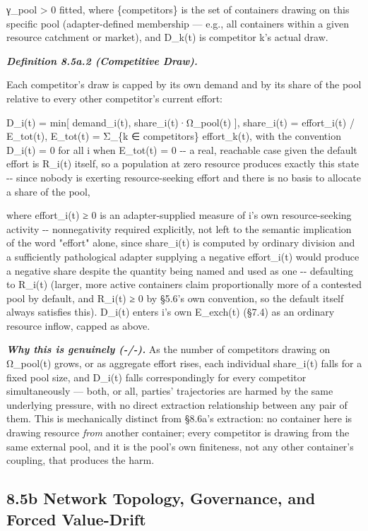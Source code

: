 \documentclass[
]{article}
\begin{document}
γ\_pool \textgreater{} 0 fitted, where \{competitors\} is the set of
containers drawing on this specific pool (adapter-defined membership ---
e.g., all containers within a given resource catchment or market), and
D\_k(t) is competitor k's actual draw.

\emph{\textbf{Definition 8.5a.2 (Competitive Draw).}}

Each competitor's draw is capped by its own demand and by its share of
the pool relative to every other competitor's current effort:

D\_i(t) = min{[} demand\_i(t), share\_i(t)·Ω\_pool(t) {]}, share\_i(t) =
effort\_i(t) / E\_tot(t), E\_tot(t) = Σ\_\{k ∈ competitors\}
effort\_k(t), with the convention D\_i(t) = 0 for all i when E\_tot(t) =
0 -\/- a real, reachable case given the default effort is R\_i(t)
itself, so a population at zero resource produces exactly this state
-\/- since nobody is exerting resource-seeking effort and there is no
basis to allocate a share of the pool,

where effort\_i(t) ≥ 0 is an adapter-supplied measure of i's own
resource-seeking activity -\/- nonnegativity required explicitly, not
left to the semantic implication of the word "effort" alone, since
share\_i(t) is computed by ordinary division and a sufficiently
pathological adapter supplying a negative effort\_i(t) would produce a
negative share despite the quantity being named and used as one -\/-
defaulting to R\_i(t) (larger, more active containers claim
proportionally more of a contested pool by default, and R\_i(t) ≥ 0 by
§5.6's own convention, so the default itself always satisfies this).
D\_i(t) enters i's own E\_exch(t) (§7.4) as an ordinary resource inflow,
capped as above.

\emph{\textbf{Why this is genuinely (-/-).}} As the number of
competitors drawing on Ω\_pool(t) grows, or as aggregate effort rises,
each individual share\_i(t) falls for a fixed pool size, and D\_i(t)
falls correspondingly for every competitor simultaneously --- both, or
all, parties' trajectories are harmed by the same underlying pressure,
with no direct extraction relationship between any pair of them. This is
mechanically distinct from §8.6a's extraction: no container here is
drawing resource \emph{from} another container; every competitor is
drawing from the same external pool, and it is the pool's own
finiteness, not any other container's coupling, that produces the harm.

\hypertarget{b-network-topology-governance-and-forced-value-drift}{%
\subsection{8.5b Network Topology, Governance, and Forced
Value-Drift}\label{b-network-topology-governance-and-forced-value-drift}}
\end{document}
